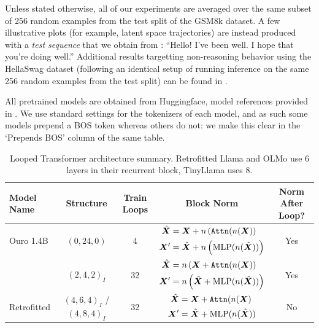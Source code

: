 Unless stated otherwise, all of our experiments are averaged over the same subset of 256 random examples from the test split of the GSM8k \citep{cobbe2021gsm8k} dataset. A few illustrative plots (for example, latent space trajectories) are instead produced with a \emph{test sequence} that we obtain from \citet{barbero2025llms}: ``Hello! I've been well. I hope that you're doing well.'' Additional results targetting non-reasoning behavior using the HellaSwag dataset (following an identical setup of running inference on the same 256 random examples from the test split) can be found in .

All pretrained models are obtained from Huggingface, model references provided in . We use standard settings for the tokenizers of each model, and as such some models prepend a BOS token whereas others do not: we make this clear in the `Prepends BOS' column of the same table.

\begin{table}[ht]
    \centering
    \caption{{Looped Transformer architecture summary.} Retrofitted Llama and OLMo use 6 layers in their recurrent block, TinyLlama uses 8.}
    \label{tab:looped_model_details}
    \begin{tabularx}{\textwidth}{Xcccc}
        \toprule
        \textbf{Model Name} & \textbf{Structure} & \textbf{Train Loops} & \textbf{Block Norm} & \textbf{Norm After Loop?} \\
        \midrule
        Ouro 1.4B \citep{zhu2025scaling} & $(0,24,0)$ & 4 & $\begin{aligned}
            \hat{{\bm{X}}} &=  {\bm{X}} + n \left (\operatorname{\texttt{Attn}}(n({\bm{X}}) \right ) \\
    {{\bm{X}}}' &=  \hat{{\bm{X}}} + n \left (\text{MLP}(n(\hat{{\bm{X}}})) \right ) \\
        \end{aligned}$ & Yes \\ \midrule
        \raven{} \citep{geiping2025scaling} & $(2,4,2)_I$ & 32 & $\begin{aligned}
            \hat{{\bm{X}}} &= n \left ( {\bm{X}} + \operatorname{\texttt{Attn}}(n({\bm{X}}) \right ) \\
    {{\bm{X}}}' &= n \left ( \hat{{\bm{X}}} + \text{MLP}(n(\hat{{\bm{X}}})) \right )
        \end{aligned}$ & Yes \\ \midrule
        Retrofitted \citep{mcleish2025teaching} & $(4,6,4)_I$ / $(4,8,4)_I$ & 32 & $\begin{aligned}
            \hat{{\bm{X}}} &= {\bm{X}} + \operatorname{\texttt{Attn}}(n({\bm{X}}) \\
    {{\bm{X}}}' &= \hat{{\bm{X}}} + \text{MLP}(n(\hat{{\bm{X}}})) 
        \end{aligned}$ & No \\
        \bottomrule
    \end{tabularx}
\end{table}

